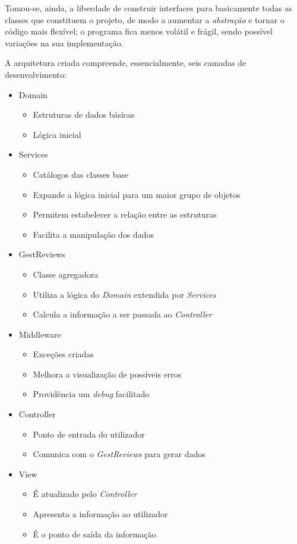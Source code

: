 \documentclass[11pt]{article}
\begin{document}
Tomou-se, ainda, a liberdade de construir interfaces para basicamente todas as classes que constituem o projeto,
de modo a aumentar a \textit{abstração} e tornar o código mais flexível;
o programa fica menos volátil e frágil, sendo possível variações na sua implementação.  

A arquitetura criada compreende, essencialmente, seis camadas de desenvolvimento:

\begin{itemize}
	\item Domain
		\begin{itemize}
			\item Estruturas de dados básicas
			\item Lógica inicial 
		\end{itemize}
	\item Services
		\begin{itemize}
			\item Catálogos das classes base
			\item Expande a lógica inicial para um maior grupo de objetos
			\item Permitem estabelecer a relação entre as estruturas
			\item Facilita a manipulação dos dados
		\end{itemize}
	\item GestReviews
		\begin{itemize}
			\item Classe agregadora 
			\item Utiliza a lógica do \textit{Domain} extendida por \textit{Services}
			\item Calcula a informação a ser passada ao \textit{Controller} 
		\end{itemize}
	\item Middleware
		\begin{itemize}
			\item Exceções criadas
			\item Melhora a visualização de possíveis erros
			\item Providência um \textit{debug} facilitado
		\end{itemize}
	\item Controller
		\begin{itemize}
			\item Ponto de entrada do utilizador
			\item Comunica com o \textit{GestReviews} para gerar dados
		\end{itemize}
	\item View	
		\begin{itemize}
			\item É atualizado pelo \textit{Controller}
			\item Apresenta a informação ao utilizador
			\item É o ponto de saída da informação
		\end{itemize}
\end{itemize}
\end{document}
